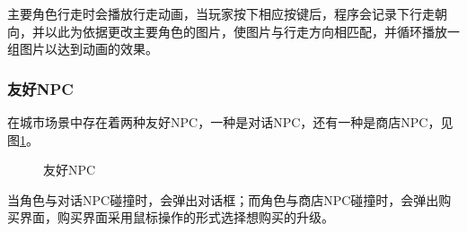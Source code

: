 \documentclass{ctexart}
\begin{document}
主要角色行走时会播放行走动画，当玩家按下相应按键后，程序会记录下行走朝向，并以此为依据更改主要角色的图片，使图片与行走方向相匹配，并循环播放一组图片以达到动画的效果。

\subsubsection{友好NPC}
在城市场景中存在着两种友好NPC，一种是对话NPC，还有一种是商店NPC，见图\ref{fig:友好NPC}。
\begin{figure}[h]
\centering
{}
\caption{\label{fig:友好NPC}友好NPC}
\end{figure}

当角色与对话NPC碰撞时，会弹出对话框；而角色与商店NPC碰撞时，会弹出购买界面，购买界面采用鼠标操作的形式选择想购买的升级。
\end{document}
